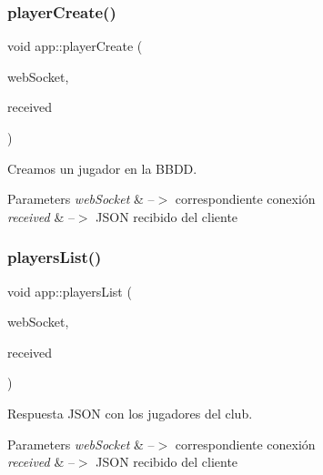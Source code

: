 \subsubsection{\texorpdfstring{player\+Create()}{playerCreate()}}
{\footnotesize\ttfamily void app\+::player\+Create (\begin{DoxyParamCaption}\item[{ix\+::\+Web\+Socket $\ast$}]{web\+Socket,  }\item[{\mbox{\hyperlink{classnlohmann_1_1basic__json}{J\+S\+ON}}}]{received }\end{DoxyParamCaption})}



Creamos un jugador en la B\+B\+DD. 


\begin{DoxyParams}{Parameters}
{\em web\+Socket} & --$>$ correspondiente conexión \\
\hline
{\em received} & --$>$ J\+S\+ON recibido del cliente \\
\hline
\end{DoxyParams}
\mbox{\label{classapp_aeddfad0a193f1b1c8581d31977ff4c10}} 
\subsubsection{\texorpdfstring{players\+List()}{playersList()}}
{\footnotesize\ttfamily void app\+::players\+List (\begin{DoxyParamCaption}\item[{ix\+::\+Web\+Socket $\ast$}]{web\+Socket,  }\item[{\mbox{\hyperlink{classnlohmann_1_1basic__json}{J\+S\+ON}}}]{received }\end{DoxyParamCaption})}



Respuesta J\+S\+ON con los jugadores del club. 


\begin{DoxyParams}{Parameters}
{\em web\+Socket} & --$>$ correspondiente conexión \\
\hline
{\em received} & --$>$ J\+S\+ON recibido del cliente \\
\hline
\end{DoxyParams}
\mbox{\label{classapp_af87506f90057b288a801f2a0d4c00ef4}} 
